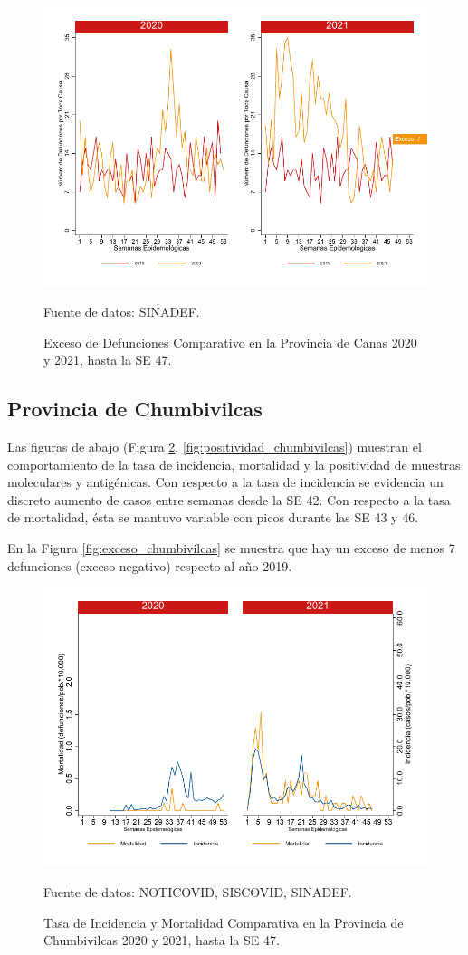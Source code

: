 \documentclass[12pt,a4paper,openany]{book}
\begin{document}
		\begin{figure}[h]
			\caption{Exceso de Defunciones Comparativo en la Provincia de Canas 2020 y 2021, hasta la SE 47.}\label{fig:exceso_canchis}
			\begin{center}
				\includegraphics[width=0.7\linewidth]{../figuras/exceso_5}
			\end{center}
			{\footnotesize {Fuente de datos: SINADEF.}}
		\end{figure}
		
		\clearpage
		
		\subsection*{Provincia de Chumbivilcas}
		\noindent Las figuras de abajo (Figura \ref{fig:inc_mort_chumbivilcas}, \ref{fig:positividad_chumbivilcas}) muestran el comportamiento de la tasa de incidencia, mortalidad y la positividad de muestras moleculares y antigénicas. Con respecto a la tasa de incidencia se evidencia un discreto aumento de casos entre semanas desde la SE 42. Con respecto a la tasa de mortalidad, ésta se mantuvo variable con picos durante las SE 43 y 46.
		
		En la Figura \ref{fig:exceso_chumbivilcas} se muestra que hay un exceso de menos 7 defunciones (exceso negativo) respecto al año 2019.
		
		\begin{figure}[h]
			\caption{Tasa de Incidencia y Mortalidad Comparativa en la Provincia de Chumbivilcas 2020 y 2021, hasta la SE 47.}\label{fig:inc_mort_chumbivilcas}
			\begin{center}
				\includegraphics[width=0.7\linewidth]{../figuras/incidencia_mortalidad_20_21_6}
			\end{center}
			{\footnotesize {Fuente de datos: NOTICOVID, SISCOVID, SINADEF.}}
		\end{figure}
		
\end{document}
